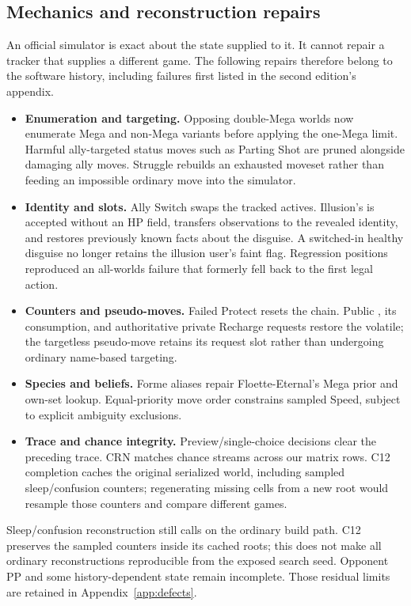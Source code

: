 \subsection{Mechanics and reconstruction repairs}
An official simulator is exact about the state supplied to it. It cannot
repair a tracker that supplies a different game. The following repairs
therefore belong to the software history, including failures first listed
in the second edition's appendix.
\begin{itemize}
 \item \textbf{Enumeration and targeting.} Opposing double-Mega worlds now
 enumerate Mega and non-Mega variants before applying the one-Mega limit.
 Harmful ally-targeted status moves such as Parting Shot are pruned alongside
 damaging ally moves. Struggle rebuilds an exhausted moveset rather than
 feeding an impossible ordinary move into the simulator.
 \item \textbf{Identity and slots.} Ally Switch swaps the tracked actives.
 Illusion's  is accepted without an HP field, transfers
 observations to the revealed identity, and restores previously known facts
 about the disguise. A switched-in healthy disguise no longer retains the
 illusion user's faint flag. Regression positions reproduced an all-worlds
 failure that formerly fell back to the first legal action.
 \item \textbf{Counters and pseudo-moves.} Failed Protect resets the chain.
 Public , its consumption, and authoritative private
 Recharge requests restore the volatile; the targetless pseudo-move retains
 its request slot rather than undergoing ordinary name-based targeting.
 \item \textbf{Species and beliefs.} Forme aliases repair Floette-Eternal's
 Mega prior and own-set lookup. Equal-priority move order constrains sampled
 Speed, subject to explicit ambiguity exclusions.
 \item \textbf{Trace and chance integrity.} Preview/single-choice decisions
 clear the preceding trace. CRN matches chance streams across our matrix
 rows. C12 completion caches the original serialized world, including sampled
 sleep/confusion counters; regenerating missing cells from a new root would
 resample those counters and compare different games.
\end{itemize}
Sleep/confusion reconstruction still calls  on the ordinary
build path. C12 preserves the sampled counters inside its cached roots; this
does not make all ordinary reconstructions reproducible from the exposed
search seed. Opponent PP and some history-dependent state remain incomplete.
Those residual limits are retained in Appendix~\ref{app:defects}.

